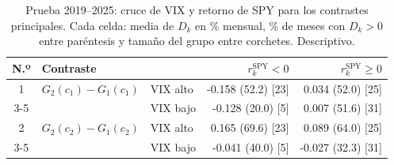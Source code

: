 \begin{table}[h]
\centering
\footnotesize
\setlength{\tabcolsep}{4pt}
\caption{Prueba 2019--2025: cruce de VIX y retorno de SPY para los contrastes principales. Cada celda: media de $D_k$ en \% mensual, \% de meses con $D_k>0$ entre paréntesis y tamaño del grupo entre corchetes. Descriptivo.}\label{tab:r4_cruce}
\begin{tabular}{|c|l|l|r|r|}
\hline
\textbf{N.º} & \textbf{Contraste} & & \textbf{$r^{\mathrm{SPY}}_k<0$} & \textbf{$r^{\mathrm{SPY}}_k\ge 0$} \\ \hline
1 & $G_2(c_1)-G_1(c_1)$ & VIX alto & -0.158 (52.2) [23] & 0.034 (52.0) [25] \\ \cline{3-5}
 & & VIX bajo & -0.128 (20.0) [5] & 0.007 (51.6) [31] \\ \hline
2 & $G_2(c_2)-G_1(c_2)$ & VIX alto & 0.165 (69.6) [23] & 0.089 (64.0) [25] \\ \cline{3-5}
 & & VIX bajo & -0.041 (40.0) [5] & -0.027 (32.3) [31] \\ \hline
\end{tabular}
\end{table}

